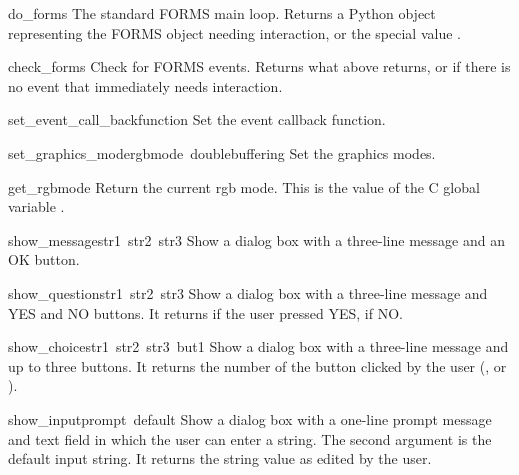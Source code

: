 \begin{funcdesc}{do_forms}{}
The standard FORMS main loop.  Returns a Python object representing
the FORMS object needing interaction, or the special value
.
\end{funcdesc}

\begin{funcdesc}{check_forms}{}
Check for FORMS events.  Returns what  above returns,
or  if there is no event that immediately needs
interaction.
\end{funcdesc}

\begin{funcdesc}{set_event_call_back}{function}
Set the event callback function.
\end{funcdesc}

\begin{funcdesc}{set_graphics_mode}{rgbmode\, doublebuffering}
Set the graphics modes.
\end{funcdesc}

\begin{funcdesc}{get_rgbmode}{}
Return the current rgb mode.  This is the value of the C global
variable .
\end{funcdesc}

\begin{funcdesc}{show_message}{str1\, str2\, str3}
Show a dialog box with a three-line message and an OK button.
\end{funcdesc}

\begin{funcdesc}{show_question}{str1\, str2\, str3}
Show a dialog box with a three-line message and YES and NO buttons.
It returns  if the user pressed YES,  if NO.
\end{funcdesc}

\begin{funcdesc}{show_choice}{str1\, str2\, str3\, but1}
Show a dialog box with a three-line message and up to three buttons.
It returns the number of the button clicked by the user
(,  or ).
\end{funcdesc}

\begin{funcdesc}{show_input}{prompt\, default}
Show a dialog box with a one-line prompt message and text field in
which the user can enter a string.  The second argument is the default
input string.  It returns the string value as edited by the user.
\end{funcdesc}

